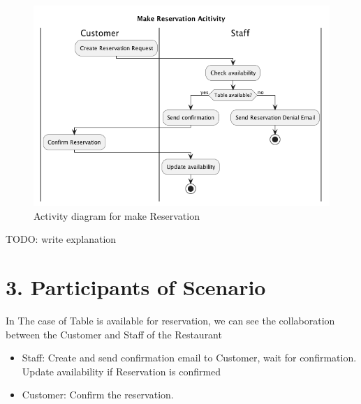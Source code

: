 \documentclass{article}
\begin{document}
\subsection*{}
\begin{figure}[h]
  \includegraphics[scale=0.5]{out/RRS_activity/RRS_activity.png}
  \centering
  \caption{Activity diagram for make Reservation}
  \centering
\end{figure}
TODO: write explanation

\clearpage
\section*{3. Participants of Scenario}
In The case of Table is available for reservation, we can see the collaboration between the Customer
and Staff of the Restaurant

\begin{itemize}
  \item Staff: Create and send confirmation email to Customer, wait for confirmation. Update availability if Reservation is confirmed
  \item Customer: Confirm the reservation.
\end{itemize}
\end{document}
